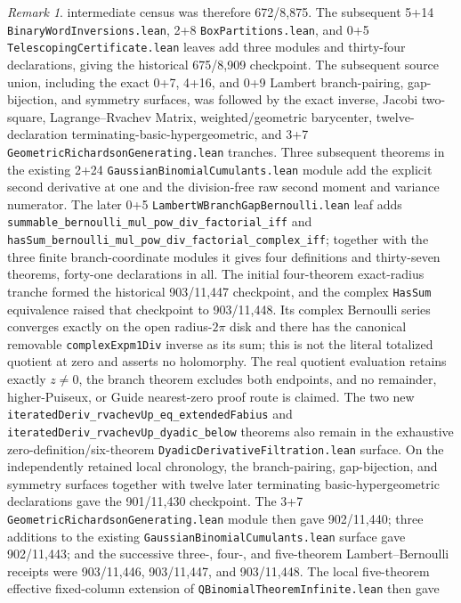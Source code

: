 \documentclass[11pt,oneside]{article}
\theoremstyle{definition}
\theoremstyle{remark}
\newtheorem{remark}[theorem]{Remark}
\begin{document}
\begin{remark}
intermediate census was therefore 672/8,875.  The subsequent
5+14 \nolinkurl{BinaryWordInversions.lean}, 2+8
\nolinkurl{BoxPartitions.lean}, and 0+5
\nolinkurl{TelescopingCertificate.lean} leaves add three modules and thirty-four
declarations, giving the historical 675/8,909 checkpoint.  The subsequent
source union, including the exact 0+7, 4+16, and 0+9 Lambert branch-pairing,
gap-bijection, and symmetry surfaces, was followed by the exact inverse,
Jacobi two-square, Lagrange--Rvachev Matrix, weighted/geometric barycenter,
twelve-declaration terminating-basic-hypergeometric, and 3+7
\nolinkurl{GeometricRichardsonGenerating.lean} tranches.  Three subsequent
theorems in the existing 2+24
\nolinkurl{GaussianBinomialCumulants.lean} module add the explicit second
derivative at one and the division-free raw second moment and variance
numerator.  The later 0+5
\nolinkurl{LambertWBranchGapBernoulli.lean} leaf adds
\nolinkurl{summable_bernoulli_mul_pow_div_factorial_iff} and
\nolinkurl{hasSum_bernoulli_mul_pow_div_factorial_complex_iff}; together with
the three finite branch-coordinate modules it gives four definitions and
thirty-seven theorems, forty-one declarations in all.  The initial
four-theorem exact-radius tranche formed the historical 903/11,447 checkpoint,
and the complex \nolinkurl{HasSum} equivalence raised that checkpoint to
903/11,448.  Its complex Bernoulli
series converges exactly on the open radius-\(2\pi\) disk and there has the
canonical removable \nolinkurl{complexExpm1Div} inverse as its sum; this is not
the literal totalized quotient at zero and asserts no holomorphy.  The real
quotient evaluation retains exactly \(z\ne0\), the branch theorem excludes
both endpoints, and no remainder, higher-Puiseux, or Guide nearest-zero proof
route is claimed.  The two new
\nolinkurl{iteratedDeriv_rvachevUp_eq_extendedFabius} and
\nolinkurl{iteratedDeriv_rvachevUp_dyadic_below} theorems also remain in the
exhaustive zero-definition/six-theorem
\nolinkurl{DyadicDerivativeFiltration.lean} surface.
On the independently retained local chronology,
the branch-pairing, gap-bijection, and symmetry surfaces together with twelve
later terminating basic-hypergeometric declarations gave the 901/11,430
checkpoint.  The 3+7 \nolinkurl{GeometricRichardsonGenerating.lean} module
then gave 902/11,440; three additions to the existing
\nolinkurl{GaussianBinomialCumulants.lean} surface gave 902/11,443; and the
successive three-, four-, and five-theorem Lambert--Bernoulli receipts were
903/11,446, 903/11,447, and 903/11,448.  The local five-theorem effective
fixed-column extension of \nolinkurl{QBinomialTheoremInfinite.lean} then gave

\end{remark}
\end{document}
